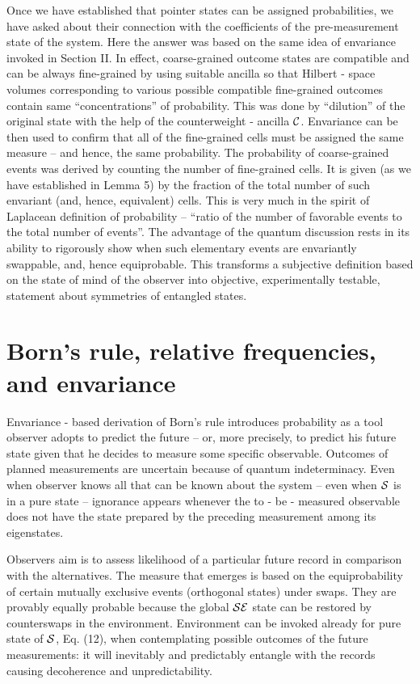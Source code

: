 \documentclass[aps,pra,epsfig,11pt,floatfix]{revtex4}
\begin{document}
Once we have established that pointer states can be assigned probabilities, we
have asked about their connection with the coefficients of the pre-measurement
state of the system. Here the answer was based on the same idea of envariance
invoked in Section II. In effect, coarse-grained outcome states are compatible
and can be always fine-grained by using suitable ancilla so that 
Hilbert - space volumes corresponding to various possible compatible 
fine-grained outcomes
contain same ``concentrations'' of probability. This was done by ``dilution''
of the original state with the help of the counterweight - ancilla ${\cal C}$. Envariance
can be then used to confirm that all of the fine-grained cells must be assigned
the same measure -- and hence, the same probability. The probability of
coarse-grained events was derived by counting the number of fine-grained cells.
It is given (as we have established in Lemma 5) by the fraction of the total
number of such envariant (and, hence, equivalent) cells. This is very much in
the spirit of Laplacean definition of probability -- ``ratio of the number of
favorable events to the total number of events''. The advantage of the quantum
discussion rests in its ability to rigorously show when such elementary events
are envariantly swappable, and, hence equiprobable. This transforms a
subjective definition based on the state of mind of the observer into objective, 
experimentally testable, statement about symmetries of entangled states.


\section{Born's rule, relative frequencies, and envariance}

Envariance - based derivation of Born's rule introduces probability as a tool
observer adopts to predict the future -- or, more precisely, to predict his future state
given that he decides to measure some specific observable. Outcomes of planned
measurements are uncertain because of quantum indeterminacy. Even when observer
knows all that can be known about the system -- even when ${\cal S}$ is in
a pure state -- ignorance appears whenever the to - be - measured observable
does not have the state prepared by the preceding measurement among
its eigenstates.

Observers aim is to assess likelihood of a particular future record in
comparison with the alternatives. The measure that emerges is based on
the equiprobability of certain mutually exclusive events (orthogonal states) under
swaps. They are provably equally probable because the global ${\cal SE}$ 
state can be restored by counterswaps in the environment. Environment 
can be invoked already for pure state of ${\cal S}$, Eq. (12), when 
contemplating possible outcomes of the future measurements: it will 
inevitably and predictably entangle with the records causing decoherence 
and unpredictability.
\end{document}
